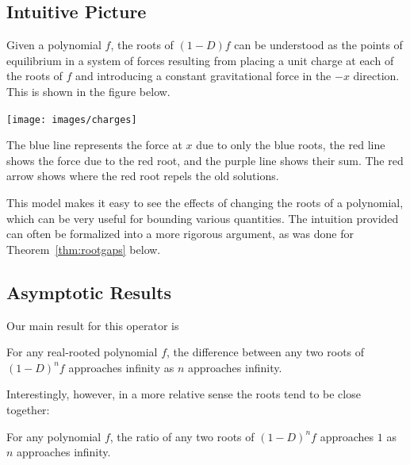 \documentclass[a0,landscape]{a0poster}
\begin{document}
\begin{multicols}{2}
\subsection*{Intuitive Picture}

Given a polynomial $f$, the roots of ${(1-D)f}$ can be understood as the points of equilibrium in a system of forces resulting from placing a unit charge at each of the roots of $f$ and introducing a constant gravitational force in the $-x$ direction. This is shown in the figure below.
\vspace{1cm}
\begin{center}
\texttt{[image: images/charges]}
\end{center}
\vspace{1cm}
The blue line represents the force at $x$ due to only the blue roots, the red line shows the force due to the red root, and the purple line shows their sum. The red arrow shows where the red root repels the old solutions.

This model makes it easy to see the effects of changing the roots of a polynomial, which can be very useful for bounding various quantities. The intuition provided can often be formalized into a more rigorous argument, as was done for Theorem~\ref{thm:rootgaps} below.
\columnbreak


\subsection*{Asymptotic Results}

Our main result for this operator is

\begin{theorem}
\label{thm:rootgaps}
	For any real-rooted polynomial $f$, the difference between any two roots of ${(1-D)^n f}$ approaches infinity as $n$ approaches infinity.
\end{theorem}

Interestingly, however, in a more relative sense the roots tend to be close together:

\begin{theorem}
\label{thm:rootratio}
	For any polynomial $f$, the ratio of any two roots of ${(1-D)^n f}$ approaches $1$ as $n$ approaches infinity.
\end{theorem}



\end{multicols}
\end{document}
